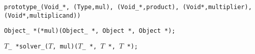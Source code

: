 
\tt{prototype_(Void_*, (Type,mul), (Void_*,product), (Void*,multiplier), (Void*,multiplicand))}


\tt{Object_ *(*mul)(Object_ *, Object *, Object *);}


$T$\tt{_ *solver_(}$T$\tt{, mul)(}$T$\tt{_ *,} $T$ \tt{*,} $T$ \tt{*);}
